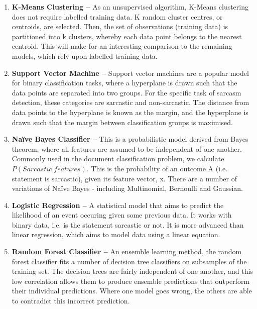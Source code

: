 \documentclass[12pt,a4paper]{article}
\begin{document}
\begin{enumerate}
	\item \textbf{K-Means Clustering --} As an unsupervised algorithm, K-Means clustering does not require labelled training data. K random cluster centres, or centroids, are selected. Then, the set of observations (training data) is partitioned into k clusters, whereby each data point belongs to the nearest centroid. This will make for an interesting comparison to the remaining models, which rely upon labelled training data.
	
	\item \textbf{Support Vector Machine --} Support vector machines are a popular model for binary classification tasks, where a hyperplane is drawn such that the data points are separated into two groups. For the specific task of sarcasm detection, these categories are sarcastic and non-sarcastic. The distance from data points to the hyperplane is known as the margin, and  the hyperplane is drawn such that the margin between classification groups is maximised.
	
	\item \textbf{Na\"{i}ve Bayes Classifier --} This is a probabilistic model derived from Bayes theorem, where all features are assumed to be independent of one another. Commonly used in the document classification problem, we calculate ${P(Sarcastic | features)}$. This is  the probability of an outcome A (i.e. statement is sarcastic), given its feature vector, x. There are a number of variations of Na\"{i}ve Bayes - including Multinomial, Bernoulli and Gaussian. 

	\item \textbf{Logistic Regression --} A statistical model that aims to predict the likelihood of an event occuring given some previous data. It works with binary data, i.e. is the statement sarcastic or not. It is more advanced than linear regression, which aims to model data using a linear equation.

	\item \textbf{Random Forest Classifier --}
	An ensemble learning method, the random forest classifier fits a number of decision tree classifiers on subsamples of the training set. The decision trees are fairly independent of one another, and this low correlation allows them to produce ensemble predictions that outperform their individual predictions. Where one model goes wrong, the others are able to contradict this incorrect prediction.
\end{enumerate}
\end{document}
